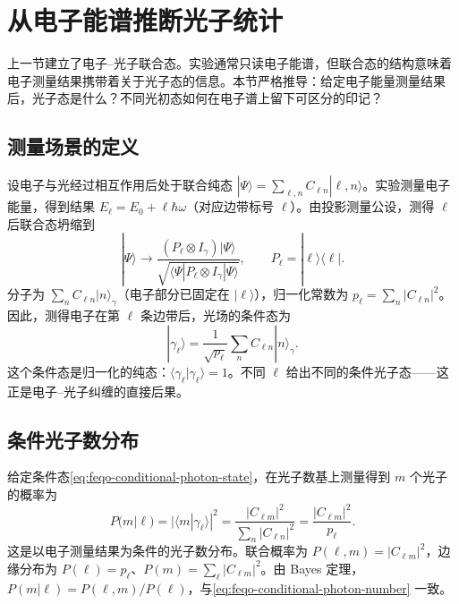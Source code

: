 \section{从电子能谱推断光子统计}
\label{chap:feqo-photon-statistics}

上一节建立了电子--光子联合态。实验通常只读电子能谱，但联合态的结构意味着电子测量结果携带着关于光子态的信息。本节严格推导：给定电子能量测量结果后，光子态是什么？不同光初态如何在电子谱上留下可区分的印记？

\subsection{测量场景的定义}

设电子与光经过相互作用后处于联合纯态 \(|\Psi\rangle=\sum_{\ell,n}C_{\ell n}|\ell,n\rangle\)。实验测量电子能量，得到结果 \(E_\ell=E_0+\ell\hbar\omega\)（对应边带标号 \(\ell\)）。由投影测量公设，测得 \(\ell\) 后联合态坍缩到
\begin{equation}
|\Psi\rangle\to\frac{(P_\ell\otimes I_\gamma)|\Psi\rangle}
{\sqrt{\langle\Psi|P_\ell\otimes I_\gamma|\Psi\rangle}},
\qquad P_\ell=|\ell\rangle\langle\ell|.
\label{eq:feqo-electron-projection}
\end{equation}
分子为 \(\sum_n C_{\ell n}|n\rangle_\gamma\)（电子部分已固定在 \(|\ell\rangle\)），归一化常数为 \(p_\ell=\sum_n|C_{\ell n}|^2\)。因此，测得电子在第 \(\ell\) 条边带后，光场的条件态为
\begin{equation}
|\gamma_\ell\rangle=\frac{1}{\sqrt{p_\ell}}
\sum_n C_{\ell n}|n\rangle_\gamma.
\label{eq:feqo-conditional-photon-state}
\end{equation}
这个条件态是归一化的纯态：\(\langle\gamma_\ell|\gamma_\ell\rangle=1\)。不同 \(\ell\) 给出不同的条件光子态——这正是电子--光子纠缠的直接后果。

\subsection{条件光子数分布}

给定条件态\cref{eq:feqo-conditional-photon-state}，在光子数基上测量得到 \(m\) 个光子的概率为
\begin{equation}
P(m|\ell)=|\langle m|\gamma_\ell\rangle|^2
=\frac{|C_{\ell m}|^2}{\sum_n|C_{\ell n}|^2}
=\frac{|C_{\ell m}|^2}{p_\ell}.
\label{eq:feqo-conditional-photon-number}
\end{equation}
这是以电子测量结果为条件的光子数分布。联合概率为 \(P(\ell,m)=|C_{\ell m}|^2\)，边缘分布为 \(P(\ell)=p_\ell\)、\(P(m)=\sum_\ell|C_{\ell m}|^2\)。由 Bayes 定理，\(P(m|\ell)=P(\ell,m)/P(\ell)\)，与\cref{eq:feqo-conditional-photon-number} 一致。


